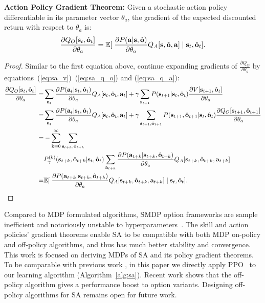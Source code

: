 \begin{thm}
  \textbf{ Action Policy Gradient Theorem: } Given a stochastic action policy
  differentiable in its parameter vector $\theta_a$, the gradient
  of the expected discounted return with respect to $\theta_a$ is:
  \begin{equation}
    \label{eq:sa_a_grad}
      \frac{\partial Q_O[{\mathbf{s}}_t,\hat{{\mathbf{o}}}_t]}{ \partial \theta_a }=\mathbb{E}[\;\frac{\partial P({\mathbf{a}}|{\mathbf{s}},\hat{{\mathbf{o}}})}{\partial \theta_a}Q_A[ {\mathbf{s}},\hat{{\mathbf{o}}},{\mathbf{a}}]\; | \; {\mathbf{s}}_t,\hat{{\mathbf{o}}}_t].
  \end{equation}
\begin{proof} Similar to the first equation above, continue expanding
  gradients of $\frac{\partial Q_O}{\partial \theta_a}$ by
  equations~(\ref{eq:sa_v})~(\ref{eq:sa_q_o}) and
  (\ref{eq:sa_q_a}):
    \begin{align*}
      \frac{\partial Q_O[{\mathbf{s}}_t,\hat{{\mathbf{o}}}_t]}{ \partial \theta_a }=&\sum_{{\mathbf{a}}_t}\frac{\partial P({\mathbf{a}}_t|{\mathbf{s}}_t,\hat{{\mathbf{o}}}_t)}{\partial \theta_a}Q_A[{\mathbf{s}}_t, \hat{{\mathbf{o}}}_t,{\mathbf{a}}_t]+\gamma\sum_{{\mathbf{s}}_{t+1}}P({\mathbf{s}}_{t+1}|{\mathbf{s}}_t,\hat{{\mathbf{o}}}_t)\frac{\partial V[{\mathbf{s}}_{t+1},\hat{{\mathbf{o}}}_t]}{\partial \theta_a}\\
      =&\sum_{{\mathbf{a}}_t}\frac{\partial P({\mathbf{a}}_t|{\mathbf{s}}_t,\hat{{\mathbf{o}}}_t)}{\partial \theta_a}Q_A[{\mathbf{s}}_t, \hat{{\mathbf{o}}}_t,{\mathbf{a}}_t]+\gamma\sum_{{\mathbf{s}}_{t+1},\hat{{\mathbf{o}}}_{t+1}}P({\mathbf{s}}_{t+1},\hat{{\mathbf{o}}}_{t+1}|{\mathbf{s}}_t,\hat{{\mathbf{o}}}_t)\frac{\partial Q_O[{\mathbf{s}}_{t+1},\hat{{\mathbf{o}}}_{t+1}]}{\partial \theta_a}\\
      =&-\sum_{{\textnormal{k}}=0}^\infty\sum_{{\mathbf{s}}_{t+k},\hat{{\mathbf{o}}}_{t+k}}\\
      &P_{\gamma}^{(k)}({\mathbf{s}}_{t+k},\hat{{\mathbf{o}}}_{t+k}|{\mathbf{s}}_{t},\hat{{\mathbf{o}}}_{t})\sum_{{\mathbf{a}}_{t+k}}\frac{\partial P({\mathbf{a}}_{t+k}|{\mathbf{s}}_{t+k},\hat{{\mathbf{o}}}_{t+k})}{\partial \theta_a}Q_A[ {\mathbf{s}}_{t+k},\hat{{\mathbf{o}}}_{t+k},{\mathbf{a}}_{t+k}]\\
      =&\mathbb{E}[\;\frac{\partial P({\mathbf{a}}_{t+k}|{\mathbf{s}}_{t+k},\hat{{\mathbf{o}}}_{t+k})}{\partial \theta_a}Q_A[ {\mathbf{s}}_{t+k},\hat{{\mathbf{o}}}_{t+k},{\mathbf{a}}_{t+k}]\; | \; {\mathbf{s}}_t,\hat{{\mathbf{o}}}_t].
  \end{align*}
\end{proof}
\end{thm}



Compared to MDP formulated algorithms, SMDP option frameworks are
sample inefficient and notoriously unstable to
hyperparameters~\cite{zhang2019dac}. The skill and action
policies' gradient theorems enable SA to be compatible with both
MDP on-policy and off-policy algorithms, and thus has much better
stability and convergence. This work is focused on deriving MDPs
of SA and its policy gradient theorems. To be comparable with
previous work \cite{zhang2019dac}, in this paper we directly
apply PPO~\cite{schulman2017proximal} to our learning algorithm
(Algorithm~\ref{alg:sa}). Recent work \cite{wulfmeier2020data}
shows that the off-policy algorithm gives a performance boost to
option variants. Designing off-policy algorithms for SA remains
open for future work.


